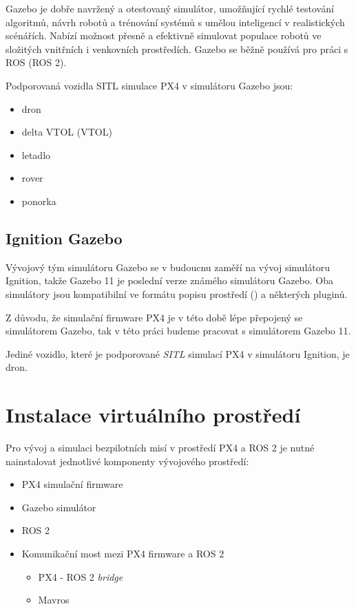 Gazebo je dobře navržený a otestovaný simulátor, umožňující rychlé testování algoritmů, návrh robotů a trénování systémů s umělou inteligencí v realistických scénářích. Nabízí možnost přesně a efektivně simulovat populace robotů ve složitých vnitřních i venkovních prostředích. Gazebo se běžně používá pro práci s ROS (ROS 2).  \cite{ROSROBOT}

Podporovaná vozidla \acs{SITL} simulace PX4 v simulátoru Gazebo jsou: \cite{GAZ}

\begin{itemize}
    \item dron
    \item delta \acs{VTOL} (\acl{VTOL})
    \item letadlo
    \item rover
    \item ponorka
\end{itemize}

\subsection{Ignition Gazebo}

Vývojový tým simulátoru Gazebo se v budoucnu zaměří na vývoj simulátoru Ignition, takže Gazebo 11 je poslední verze známého simulátoru Gazebo. Oba simulátory jsou kompatibilní ve formátu popisu prostředí () a některých pluginů. \cite{IGN}

Z důvodu, že simulační firmware PX4 je v této době lépe přepojený se simulátorem Gazebo, tak v této práci budeme pracovat s simulátorem Gazebo 11.

Jediné vozidlo, které je podporované \textit{\acl{SITL}} simulací PX4 v simulátoru Ignition, je dron.

\section{Instalace virtuálního prostředí}

Pro vývoj a simulaci bezpilotních misí v prostředí PX4 a ROS 2 je nutné nainstalovat jednotlivé komponenty vývojového prostředí:

\begin{itemize}
    \item PX4 simulační firmware
    \item Gazebo simulátor
    \item ROS 2 
    \item Komunikační most mezi PX4 firmware a ROS 2
    \begin{itemize}
        \item PX4 - ROS 2 \textit{bridge}
        \item Mavros\\
    \end{itemize}
\end{itemize}

